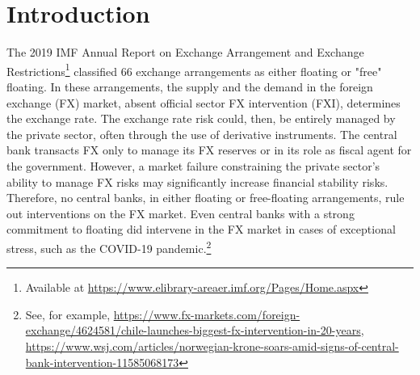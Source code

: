 \documentclass[11pt]{article}
\begin{document}





\newpage
{} %

\section{Introduction}
\label{sec:introduction}

The   2019  IMF   Annual   Report  on   Exchange   Arrangement  and   Exchange
Restrictions\footnote{Available at \url{https://www.elibrary-areaer.imf.org/Pages/Home.aspx}}
classified 66 exchange arrangements as  either floating or "free" floating. In
these arrangements,  the supply and  the demand  in the foreign  exchange (FX)
market, absent official sector FX  intervention (FXI), determines the exchange
rate. The exchange  rate risk could, then, be entirely  managed by the private
sector,  often through  the use  of derivative  instruments. The  central bank
transacts FX only to manage its FX reserves or in its role as fiscal agent for
the government.  However,  a market failure constraining  the private sector’s
ability  to manage  FX risks  may significantly  increase financial  stability
risks.   Therefore, no  central  banks, in  either  floating or  free-floating
arrangements, rule out interventions on the FX market. Even central banks with
a strong  commitment to floating  did intervene in the  FX market in  cases of
exceptional stress, such as  the COVID-19 pandemic.\footnote{See, for example,
\url{https://www.fx-markets.com/foreign-exchange/4624581/chile-launches-biggest-fx-intervention-in-20-years},
\url{https://www.wsj.com/articles/norwegian-krone-soars-amid-signs-of-central-bank-intervention-11585068173}}\\
\end{document}
